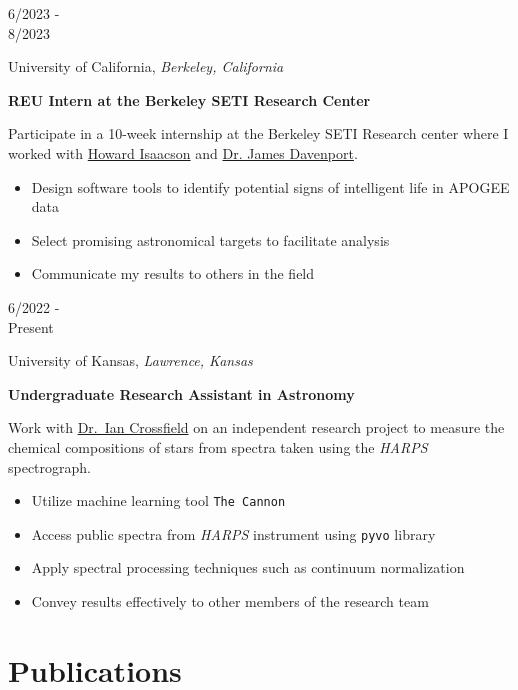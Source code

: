 \documentclass[12pt]{article}
\newenvironment{entry}[4]{
  \medskip
  \begin{minipage}[t]{0.75in}
    #3
  \end{minipage}
  \begin{minipage}[t]{\dimexpr\textwidth-0.75in}
    #1, \textit{#2}

    \textbf{#4}
    
    \smallskip
}{
  \end{minipage}
}
\begin{document}
\begin{entry}{University of California}{Berkeley, California}{6/2023 -\\ 8/2023}{REU Intern at the Berkeley SETI Research Center}
  Participate in a 10-week internship at the Berkeley SETI Research center where I worked with \href{https://astro.berkeley.edu/people/howard-isaacson/}{Howard Isaacson} and \href{https://astro.washington.edu/people/james-davenport}{Dr. James Davenport}.
  \begin{itemize}
    \item Design software tools to identify potential signs of intelligent
      life in APOGEE data
    \item Select promising astronomical targets to facilitate analysis
    \item Communicate my results to others in the field
  \end{itemize}
\end{entry}

\begin{entry}{University of Kansas}{Lawrence, Kansas}{6/2022 -\\ Present}{Undergraduate Research Assistant in Astronomy}
  Work with \href{https://physics.ku.edu/people/crossfield-ian}{Dr.\ Ian Crossfield} on an independent research project to measure the
  chemical compositions of stars from spectra taken using the \textit{HARPS}
  spectrograph.
  \begin{itemize}
    \item Utilize machine learning tool \texttt{The Cannon}
    \item Access public spectra from \textit{HARPS} instrument using
      \texttt{pyvo} library
    \item Apply spectral processing techniques such as continuum normalization
    \item Convey results effectively to other members of the research team
  \end{itemize}
\end{entry}

\section*{Publications}\vspace{-1ex}

\newcommand{\publication}[6]{
  \medskip
  \begin{minipage}[t]{0.75in}
    #3
  \end{minipage}
  \begin{minipage}[t]{\dimexpr\textwidth-0.75in}
    \textbf{#4}, #5\\
    #1, \href{#6}{\textit{#2}}
  \end{minipage}  

}
\end{document}
